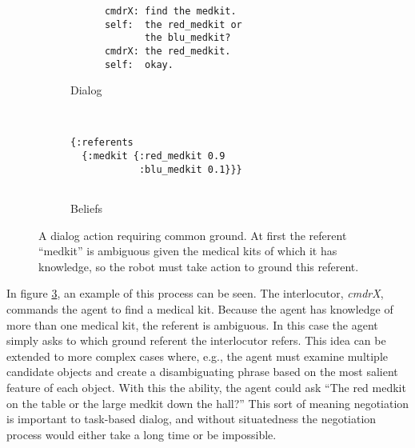 \documentclass[12pt]{article}
\begin{document}
\begin{figure}[h]
  \centering
  \begin{subfigure}{0.4\textwidth}
    \centering
\begin{verbatim}
      cmdrX: find the medkit.
      self:  the red_medkit or
             the blu_medkit?
      cmdrX: the red_medkit.
      self:  okay.
\end{verbatim}    
    \label{fig:cg_text}
    \caption{Dialog}
  \end{subfigure}
  ~\qquad\qquad
  \begin{subfigure}{0.4\textwidth}
    \centering
\begin{verbatim}
{:referents
  {:medkit {:red_medkit 0.9 
            :blu_medkit 0.1}}}


\end{verbatim}
    \label{fig:cg_beliefs}
    \caption{Beliefs}
  \end{subfigure}
  \caption{A dialog action requiring common ground. At first the
    referent ``medkit'' is ambiguous given the medical kits of which
    it has knowledge, so the robot must take action to ground this
    referent.}
  \label{fig:cg}
\end{figure}

In figure \ref{fig:cg}, an example of this process can be seen. The
interlocutor, \textit{cmdrX}, commands the agent to find a medical
kit. Because the agent has knowledge of more than one medical kit, the
referent is ambiguous. In this case the agent simply asks to which
ground referent the interlocutor refers. This idea can be extended to
more complex cases where, e.g., the agent must examine multiple
candidate objects and create a disambiguating phrase based on the most
salient feature of each object. With this the ability, the agent could
ask ``The red medkit on the table or the large medkit down the hall?''
This sort of meaning negotiation is important to task-based dialog,
and without situatedness the negotiation process would either take a
long time or be impossible.
\end{document}
